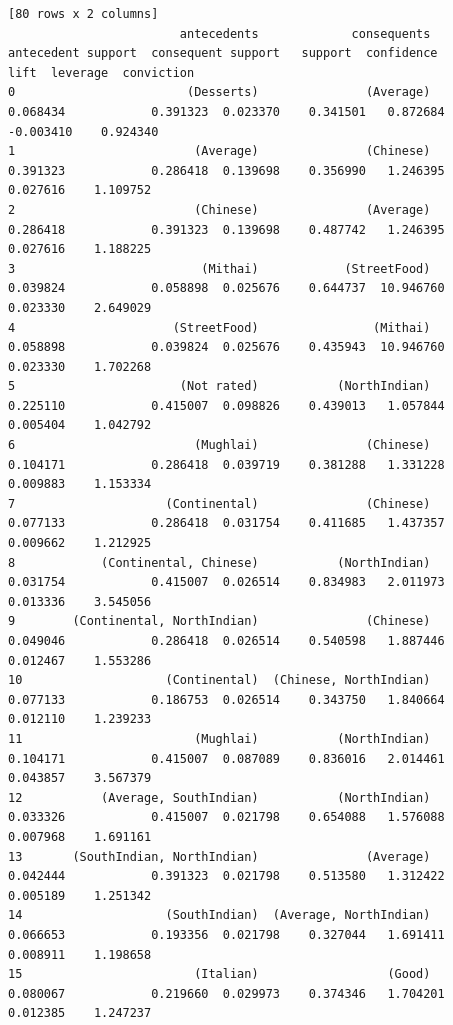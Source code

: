 \documentclass[11pt]{article} %
\begin{document}
\begin{lstlisting}
[80 rows x 2 columns]
                        antecedents             consequents  antecedent support  consequent support   support  confidence       lift  leverage  conviction
0                        (Desserts)               (Average)            0.068434            0.391323  0.023370    0.341501   0.872684 -0.003410    0.924340
1                         (Average)               (Chinese)            0.391323            0.286418  0.139698    0.356990   1.246395  0.027616    1.109752
2                         (Chinese)               (Average)            0.286418            0.391323  0.139698    0.487742   1.246395  0.027616    1.188225
3                          (Mithai)            (StreetFood)            0.039824            0.058898  0.025676    0.644737  10.946760  0.023330    2.649029
4                      (StreetFood)                (Mithai)            0.058898            0.039824  0.025676    0.435943  10.946760  0.023330    1.702268
5                       (Not rated)           (NorthIndian)            0.225110            0.415007  0.098826    0.439013   1.057844  0.005404    1.042792
6                         (Mughlai)               (Chinese)            0.104171            0.286418  0.039719    0.381288   1.331228  0.009883    1.153334
7                     (Continental)               (Chinese)            0.077133            0.286418  0.031754    0.411685   1.437357  0.009662    1.212925
8            (Continental, Chinese)           (NorthIndian)            0.031754            0.415007  0.026514    0.834983   2.011973  0.013336    3.545056
9        (Continental, NorthIndian)               (Chinese)            0.049046            0.286418  0.026514    0.540598   1.887446  0.012467    1.553286
10                    (Continental)  (Chinese, NorthIndian)            0.077133            0.186753  0.026514    0.343750   1.840664  0.012110    1.239233
11                        (Mughlai)           (NorthIndian)            0.104171            0.415007  0.087089    0.836016   2.014461  0.043857    3.567379
12           (Average, SouthIndian)           (NorthIndian)            0.033326            0.415007  0.021798    0.654088   1.576088  0.007968    1.691161
13       (SouthIndian, NorthIndian)               (Average)            0.042444            0.391323  0.021798    0.513580   1.312422  0.005189    1.251342
14                    (SouthIndian)  (Average, NorthIndian)            0.066653            0.193356  0.021798    0.327044   1.691411  0.008911    1.198658
15                        (Italian)                  (Good)            0.080067            0.219660  0.029973    0.374346   1.704201  0.012385    1.247237

\end{lstlisting}
\end{document}
